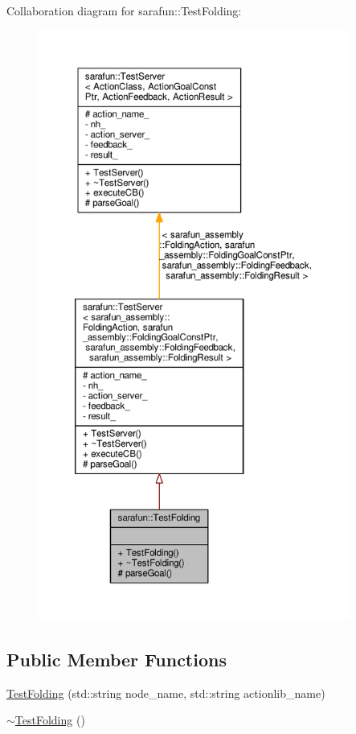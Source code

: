 Collaboration diagram for sarafun\-:\-:Test\-Folding\-:
\nopagebreak
\begin{figure}[H]
\begin{center}
\leavevmode
\includegraphics[height=550pt]{d4/da4/classsarafun_1_1TestFolding__coll__graph}
\end{center}
\end{figure}
\subsection*{Public Member Functions}
\begin{DoxyCompactItemize}
\item 
\hyperlink{classsarafun_1_1TestFolding_a8e2588633f0ed83b89bc36cd68e537d8_a8e2588633f0ed83b89bc36cd68e537d8}{Test\-Folding} (std\-::string node\-\_\-name, std\-::string actionlib\-\_\-name)
\item 
\hyperlink{classsarafun_1_1TestFolding_ae84f7398db7911dc72a929e9b4d71726_ae84f7398db7911dc72a929e9b4d71726}{$\sim$\-Test\-Folding} ()
\end{DoxyCompactItemize}
